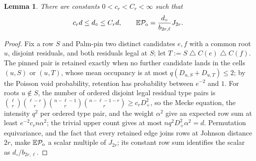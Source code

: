 \documentclass[11pt]{article}
\newtheorem{lemma}[lemma]{Lemma}
\theoremstyle{definition}
\theoremstyle{remark}
\newcommand{\E}{\mathbb E}
\newcommand{\1}{\mathbf 1}
\newcommand{\cP}{\mathcal P}
\newcommand{\sd}{\mathbin{\triangle}}
\numberwithin{equation}{section}
\begin{document}
\begin{lemma}\label{lem:odd-palm-degree}
There are constants $0<c_r<C_r<\infty$ such that
\begin{equation}\label{eq:odd-dcirc}
 c_rd\le d_\circ\le C_rd,
 \qquad
 \E\cP_{\rm o}=\frac{d_\circ}{b_{2r,\ell}}J_{2r}.
\end{equation}
\end{lemma}
\begin{proof}
Fix a row $S$ and Palm-pin two distinct candidates $e,f$ with a common
root $u$, disjoint residuals, and both residuals legal at $S$; let
$T:=S\sd C(e)\sd C(f)$.  The pinned pair is retained exactly when no
further candidate lands in the cells $(u,S)$ or $(u,T)$, whose mean
occupancy is at most $q(D_{u,S}+D_{u,T})\le2$; by the Poisson void
probability, retention has probability between $e^{-2}$ and $1$.  For
roots $u\notin S$, the number of ordered disjoint legal residual type
pairs is
$\binom\ell r\binom{\ell-r}r\binom{n-\ell-1}r\binom{n-\ell-1-r}r
\ge c_rD_+^2$, so the Mecke equation, the intensity $q^2$ per ordered
type pair, and the weight $\alpha^2$ give an expected row sum at least
$e^{-2}c_rn\alpha^2$; the trivial upper count gives at most
$nq^2D_+^2\alpha^2=d$.  Permutation equivariance, and the fact that
every retained edge joins rows at Johnson distance $2r$, make
$\E\cP_{\rm o}$ a scalar multiple of $J_{2r}$; its constant row sum
identifies the scalar as $d_\circ/b_{2r,\ell}$.
\end{proof}
\end{document}

